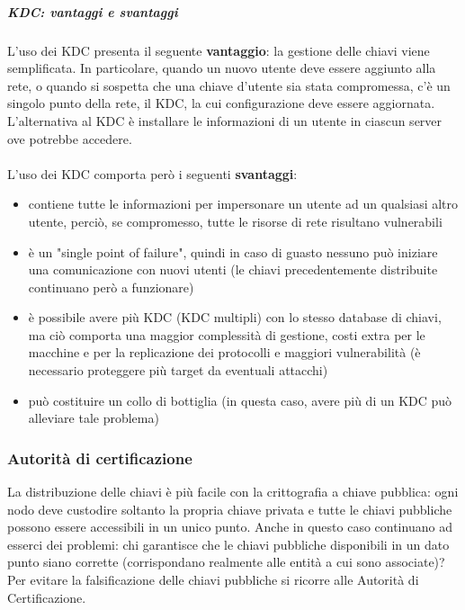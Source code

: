 \subparagraph{KDC: vantaggi e svantaggi}
L'uso dei KDC presenta il seguente \textbf{vantaggio}: la gestione delle chiavi viene semplificata. In particolare, quando un nuovo utente deve essere aggiunto alla rete, o quando si sospetta che una chiave d'utente sia stata compromessa, c'è un singolo punto della rete, il KDC, la cui configurazione deve essere aggiornata. L'alternativa al KDC è installare le informazioni di un utente in ciascun server ove potrebbe accedere. \\ \\
L'uso dei KDC comporta però i seguenti \textbf{svantaggi}: 
\begin{itemize}
	\item contiene tutte le informazioni per impersonare un utente ad un qualsiasi altro utente, perciò, se compromesso, tutte le risorse di rete risultano vulnerabili
	\item è un "single point of failure", quindi in caso di guasto nessuno può iniziare una comunicazione con nuovi utenti (le chiavi precedentemente distribuite continuano però a funzionare)
	\item è possibile avere più KDC (KDC multipli) con lo stesso database di chiavi, ma ciò comporta una maggior complessità di gestione, costi extra per le macchine e per la replicazione dei protocolli e maggiori vulnerabilità (è necessario proteggere più target da eventuali attacchi)
	\item può costituire un collo di bottiglia (in questa caso, avere più di un KDC può alleviare tale problema)
\end{itemize}  

\subsubsection{Autorità di certificazione}
La distribuzione delle chiavi è più facile con la crittografia a chiave pubblica: ogni nodo deve custodire soltanto la propria chiave privata e tutte le chiavi pubbliche possono essere accessibili in un unico punto. Anche in questo caso continuano ad esserci dei problemi: chi garantisce che le chiavi pubbliche disponibili in un dato punto siano corrette (corrispondano realmente alle entità a cui sono associate)? Per evitare la falsificazione delle chiavi pubbliche si ricorre alle Autorità di Certificazione. \\

